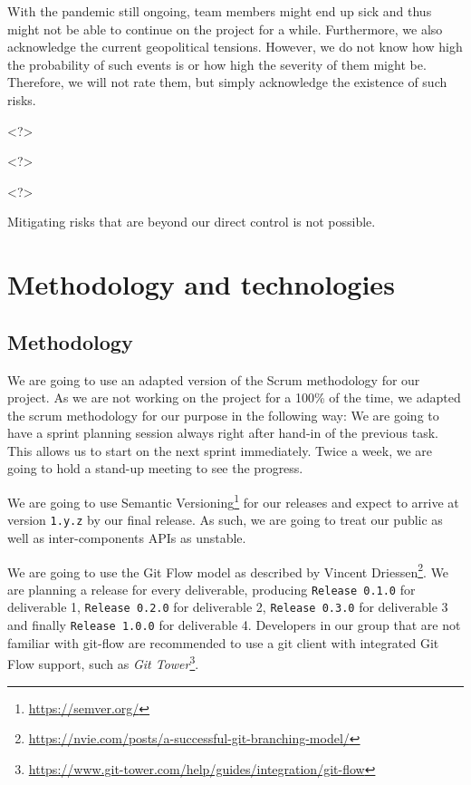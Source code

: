 \documentclass[11pt]{article}
\begin{document}
\begin{tcolorbox}[title=\textbf{Current Health and Geopolitical Crisis}, sharp corners, colframe=MaterialIndigo600, colback=MaterialIndigo100, coltitle=white]
\begin{description}[noitemsep]
\item[Risk:] With the pandemic still ongoing, team members might end up sick and thus might not be able to continue on the project for a while. Furthermore, we also acknowledge the current geopolitical tensions. However, we do not know how high the probability of such events is or how high the severity of them might be. Therefore, we will not rate them, but simply acknowledge the existence of such risks.
\item[Probability:] <?>
\item[Severity:] <?>
\item[Risk exposure:] <?>
\item[Mitigation:] Mitigating risks that are beyond our direct control is not possible.
\end{description}
\end{tcolorbox}

\section{Methodology and technologies}

\subsection{Methodology}

We are going to use an adapted version of the Scrum methodology for our project. As we are not working on the project for a 100\% of the time, we adapted the scrum methodology for our purpose in the following way: We are going to have a sprint planning session always right after hand-in of the previous task. This allows us to start on the next sprint immediately. Twice a week, we are going to hold a stand-up meeting to see the progress.

We are going to use Semantic Versioning\footnote{\url{https://semver.org/}} for our releases and expect to arrive at version \texttt{1.y.z} by our final release. As such, we are going to treat our public as well as inter-components APIs as unstable.

We are going to use the Git Flow model as described by Vincent Driessen\footnote{\url{https://nvie.com/posts/a-successful-git-branching-model/}}. We are planning a release for every deliverable, producing \texttt{Release 0.1.0} for deliverable 1, \texttt{Release 0.2.0} for deliverable 2, \texttt{Release 0.3.0} for deliverable 3 and finally \texttt{Release 1.0.0} for deliverable 4. Developers in our group that are not familiar with git-flow are recommended to use a git client with integrated Git Flow support, such as \textit{Git Tower}\footnote{\url{https://www.git-tower.com/help/guides/integration/git-flow}}. 
\end{document}
